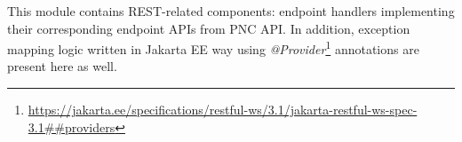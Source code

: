 \documentclass[../main.tex]{subfiles}
\begin{document}
This module contains REST-related components: endpoint handlers implementing their corresponding endpoint APIs from PNC API. In addition, exception mapping logic written in Jakarta EE way using \textit{@Provider}\footnote{\url{https://jakarta.ee/specifications/restful-ws/3.1/jakarta-restful-ws-spec-3.1##providers}} annotations are present here as well.
\end{document}
